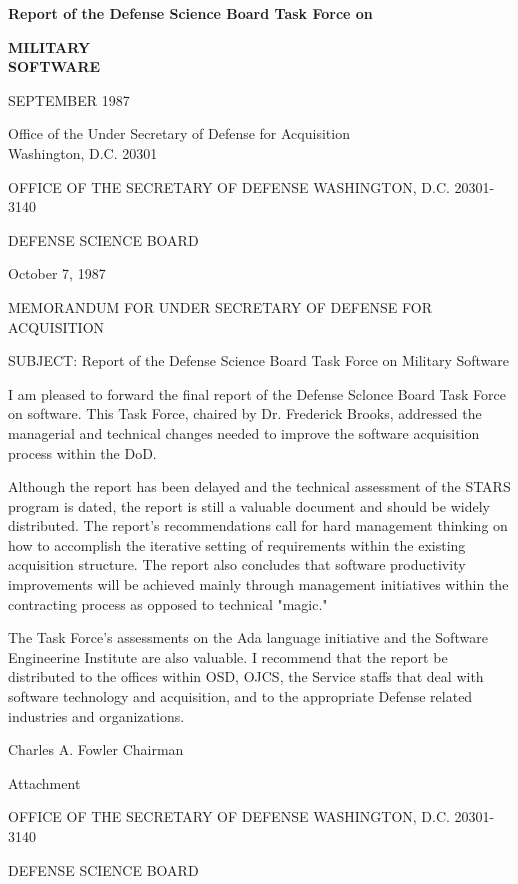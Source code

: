 \documentclass[12pt]{article}
\begin{document}
\textbf{Report of the Defense Science Board Task Force on}

\textbf{MILITARY\\ SOFTWARE}

SEPTEMBER 1987

Office of the Under Secretary of Defense for Acquisition\\
Washington, D.C. 20301

\newpage


OFFICE OF THE SECRETARY OF DEFENSE
WASHINGTON, D.C. 20301-3140

DEFENSE SCIENCE BOARD

October 7, 1987

MEMORANDUM FOR UNDER SECRETARY OF DEFENSE FOR ACQUISITION

SUBJECT: Report of the Defense Science Board Task Force on Military Software

I am pleased to forward the final report of the Defense Sclonce Board Task
Force on software. This Task Force, chaired by Dr. Frederick Brooks, addressed
the managerial and technical changes needed to improve the software
acquisition process within the DoD.

Although the report has been delayed and the technical assessment of the STARS
program is dated, the report is still a valuable document and should be widely
distributed. The report's recommendations call for hard management thinking on
how to accomplish the iterative setting of requirements within the existing
acquisition structure. The report also concludes that software productivity
improvements will be achieved mainly through management initiatives within the
contracting process as opposed to technical "magic."

The Task Force's assessments on the Ada language initiative and the Software
Engineerine Institute are also valuable.  I recommend that the report be
distributed to the offices within OSD, OJCS, the Service staffs that deal with
software technology and acquisition, and to the appropriate Defense related
industries and organizations.

Charles A. Fowler
Chairman

Attachment


OFFICE OF THE SECRETARY OF DEFENSE
WASHINGTON, D.C. 20301-3140

DEFENSE SCIENCE BOARD
\end{document}

